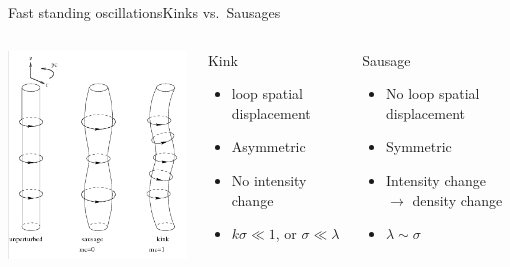 \documentclass[table]{beamer}
\begin{document}
\begin{frame}{Fast standing oscillations}{Kinks vs.\ Sausages}
\begin{columns}
    \includegraphics[width=2.5in]{kink_saus.png}
    \begin{block}{Kink}
        \begin{itemize}
            \item loop spatial displacement
            \item Asymmetric
            \item No intensity change
            \item $k\sigma \ll 1$, or $\sigma\ll\lambda$
        \end{itemize}
    \end{block}
    \begin{block}{Sausage}
        \begin{itemize}
            \item No loop spatial displacement
            \item Symmetric
            \item Intensity change\\ $\rightarrow$ density change
            \item $\lambda\sim\sigma$
        \end{itemize}
    \end{block}
\end{columns}
\end{frame}%
\end{document}
